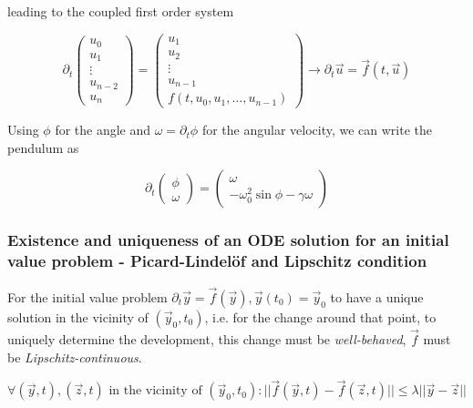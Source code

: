 leading to the coupled first order system

\begin{equation}
    \partial_t \begin{pmatrix} u_0 \\ u_1 \\ \vdots \\ u_{n-2} \\ u_n \end{pmatrix} = \begin{pmatrix} u_1 \\ u_2 \\ \vdots \\ u_{n-1} \\ f\left(t, u_0, u_1, \dots, u_{n-1}\right) \end{pmatrix} \rightarrow \partial_t \vec{u} = \vec{f}\left(t, \vec{u}\right)
\end{equation}

Using $\phi$ for the angle and $\omega = \partial_t \phi$ for the angular velocity, we can write the pendulum as

\begin{equation}
    \partial_t \begin{pmatrix} \phi \\ \omega \end{pmatrix} = \begin{pmatrix} \omega \\ - \omega_0^2 \sin \phi - \gamma \omega \end{pmatrix}
\end{equation}

\subsubsection{Existence and uniqueness of an ODE solution for an initial value problem - Picard-Lindelöf and Lipschitz condition}
For the initial value problem $\partial_t \vec{y} = \vec{f} \left(\vec{y} \right), \vec{y}(t_0) = \vec{y}_0$ to have a unique solution in the vicinity of $(\vec{y}_0,t_0)$, i.e. for the change
around that point, to uniquely determine the development, this change must be \textit{well-behaved}, $\vec{f}$ must be \textit{Lipschitz-continuous}.

\begin{equation}
    \forall (\vec{y},t),(\vec{z},t) \text{ in the vicinity of } (\vec{y}_0,t_0): ||\vec{f}(\vec{y},t) - \vec{f}(\vec{z},t)|| \leq \lambda ||\vec{y} - \vec{z}||
\end{equation}

